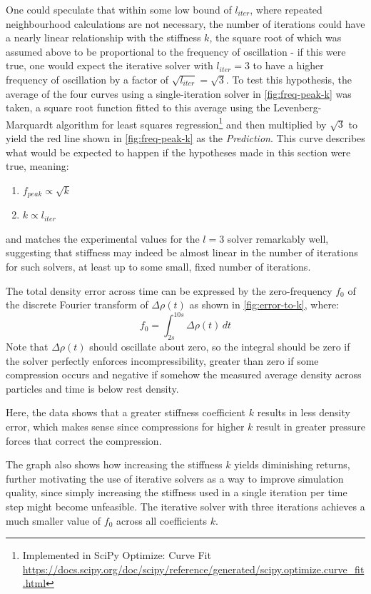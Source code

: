 One could speculate that within some low bound of $l_{iter}$, where repeated neighbourhood calculations are not necessary, the number of iterations could have a nearly linear relationship with the stiffness $k$, the square root of which was assumed above to be proportional to the frequency of oscillation - if this were true, one would expect the iterative solver with $l_{iter}=3$ to have a higher frequency of oscillation by a factor of $\sqrt{l_{iter}}=\sqrt{3}$.
To test this hypothesis, the average of the four curves using a single-iteration solver in \autoref{fig:freq-peak-k} was taken, a square root function fitted to this average using the Levenberg-Marquardt algorithm for least squares regression\footnote{Implemented in SciPy Optimize: Curve Fit \url{https://docs.scipy.org/doc/scipy/reference/generated/scipy.optimize.curve_fit.html}} and then multiplied by $\sqrt{3}$ to yield the red line shown in \autoref{fig:freq-peak-k} as the \textit{Prediction}. This curve describes what would be expected to happen if the hypotheses made in this section were true, meaning:
\begin{enumerate}
  \item $f_{peak}\propto\sqrt{k}$
  \item  $k\propto l_{iter}$
\end{enumerate}
and matches the experimental values for the $l=3$ solver remarkably well, suggesting that stiffness may indeed be almost linear in the number of iterations for such solvers, at least up to some small, fixed number of iterations.

\horizontalspacer


The total density error across time can be expressed by the zero-frequency $f_0$ of the discrete Fourier transform of $\Delta\rho (t)$ as shown in \autoref{fig:error-to-k}, where:
\begin{equation}
  f_0 = \int_{2s}^{10s} \Delta\rho (t) \,dt
\end{equation}
Note that $\Delta\rho (t)$ should oscillate about zero, so the integral should be zero if the solver perfectly enforces incompressibility, greater than zero if some compression occurs and negative if somehow the measured average density across particles and time is below rest density.

Here, the data shows that a greater stiffness coefficient $k$ results in less density error, which makes sense since compressions for higher $k$ result in greater pressure forces that correct the compression.

The graph also shows how increasing the stiffness $k$ yields diminishing returns, further motivating the use of iterative solvers as a way to improve simulation quality, since simply increasing the stiffness used in a single iteration per time step might become unfeasible. The iterative solver with three iterations achieves a much smaller value of $f_0$ across all coefficients $k$.

